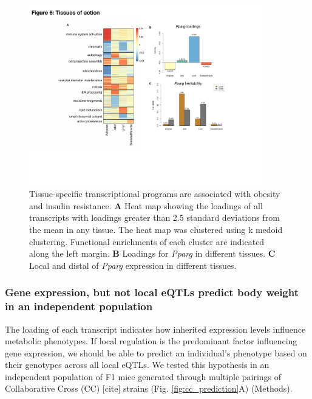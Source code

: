 \documentclass[
]{article}
\begin{document}
\begin{figure}[ht!]
\includegraphics[width=4in]{Figures/Fig6_TOA.pdf} 
\caption{Tissue-specific transcriptional programs are associated 
with obesity and insulin resistance. \textbf{A} Heat map showing 
the loadings of all transcripts with loadings greater than 2.5 
standard deviations from the mean in any tissue. The heat map was 
clustered using k medoid clustering. Functional enrichments of each 
cluster are indicated along the left margin. \textbf{B} Loadings for 
\textit{Pparg} in different tissues. \textbf{C} Local and distal of 
\textit{Pparg} expression in different tissues.
}
\label{fig:toa}
\end{figure}

\subsubsection{Gene expression, but not local eQTLs predict body weight
in an independent
population}\label{gene-expression-but-not-local-eqtls-predict-body-weight-in-an-independent-population}

The loading of each transcript indicates how inherited expression levels
influence metabolic phenotypes. If local regulation is the predominant
factor influencing gene expression, we should be able to predict an
individual's phenotype based on their genotypes across all local eQTLs.
We tested this hypothesis in an independent population of F1 mice
generated through multiple pairings of Collaborative Cross (CC)
{[}cite{]} strains (Fig. \ref{fig:cc_prediction}A) (Methods).
\end{document}
